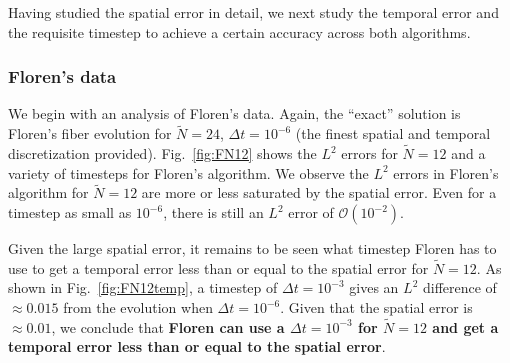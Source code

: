 Having studied the spatial error in detail, we next study the temporal error and the requisite timestep to achieve a certain accuracy across both algorithms. 
\subsubsection{Floren's data}
We begin with an analysis of Floren's data. Again, the ``exact'' solution is Floren's fiber evolution for $\tilde{N}=24$, $\Delta t =10^{-6}$ (the finest spatial and temporal discretization provided). Fig.\ \ref{fig:FN12} shows the $L^2$ errors for $\tilde{N}=12$ and a variety of timesteps for Floren's algorithm. We observe the $L^2$ errors in Floren's algorithm for $\tilde{N}=12$ are more or less saturated by the spatial error. Even for a timestep as small as $10^{-6}$, there is still an $L^2$ error of $\mathcal{O}(10^{-2})$. 

Given the large spatial error, it remains to be seen what timestep Floren has to use to get a temporal error less than or equal to the spatial error for $\tilde{N}=12$. As shown in Fig.\ \ref{fig:FN12temp}, a timestep of $\Delta t =10^{-3}$ gives an $L^2$ difference of $\approx 0.015$ from the evolution when $\Delta t =10^{-6}$. Given that the spatial error is $\approx 0.01$, we conclude that \textbf{Floren can use a $\Delta t =10^{-3}$ for $\tilde{N}=12$ and get a temporal error less than or equal to the spatial error}. 

